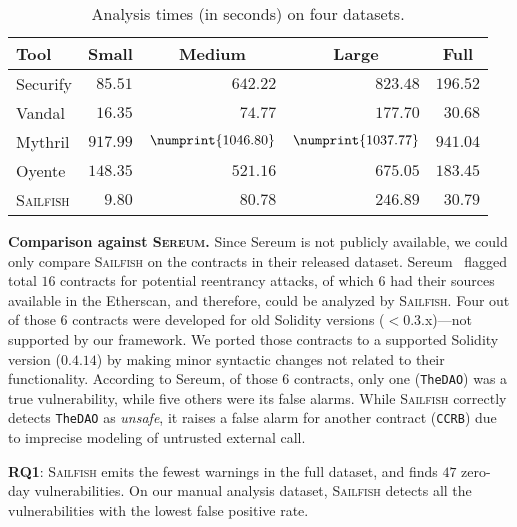 \documentclass[conference, romanappendices]{tex/IEEEtran}
\theoremstyle{bfnote}
\newcommand{\toolname}{\textsc{Sailfish}\xspace}
\newcommand{\oyente}{{\sc Oyente}\xspace}
\newcommand{\securify}{{\sc Securify}\xspace}
\newcommand{\sereum}{{\sc Sereum}\xspace}
\newcommand{\vandal}{{\sc Vandal}\xspace}
\newcommand{\solidity}{{\sc Solidity}\xspace}
\newcommand{\etherscan}{{\sc Etherscan}\xspace}
\newcommand{\mythril}{{\sc Mythril}\xspace}
\let\num\numprint
\newcommand{\zeroDays}{47}
\newcommand{\securifyAnalysisTimeSmall}{85.51}
\newcommand{\securifyAnalysisTimeMedium}{642.22}
\newcommand{\securifyAnalysisTimeLarge}{823.48}
\newcommand{\securifyAnalysisTimeFull}{196.52}
\newcommand{\vandalAnalysisTimeSmall}{16.35}
\newcommand{\vandalAnalysisTimeMedium}{74.77}
\newcommand{\vandalAnalysisTimeLarge}{177.70}
\newcommand{\vandalAnalysisTimeFull}{30.68}
\newcommand{\mythrilAnalysisTimeSmall}{917.99}
\newcommand{\mythrilAnalysisTimeMedium}{1046.80}
\newcommand{\mythrilAnalysisTimeLarge}{1037.77}
\newcommand{\mythrilAnalysisTimeFull}{941.04}
\newcommand{\oyenteAnalysisTimeSmall}{148.35}
\newcommand{\oyenteAnalysisTimeMedium}{521.16}
\newcommand{\oyenteAnalysisTimeLarge}{675.05}
\newcommand{\oyenteAnalysisTimeFull}{183.45}
\newcommand{\clintAnalysisTimeSmall}{9.80}
\newcommand{\clintAnalysisTimeMedium}{80.78}
\newcommand{\clintAnalysisTimeLarge}{246.89}
\newcommand{\clintAnalysisTimeFull}{30.79}
\begin{document}
\begin{table}[]
	\centering
	\begin{tabular}{l|rrrr}
		\toprule
		\textbf{Tool} & \multicolumn{1}{c}{\textbf{Small}} & \multicolumn{1}{c}{\textbf{Medium}} & \multicolumn{1}{c}{\textbf{Large}} & \multicolumn{1}{c}{\textbf{Full}} \\
		\midrule 
		\rowcolor{black!10} \securify & $\securifyAnalysisTimeSmall$ & $\securifyAnalysisTimeMedium$ & $\securifyAnalysisTimeLarge$ & $\securifyAnalysisTimeFull$ \\
		\vandal & $\vandalAnalysisTimeSmall$ & $\vandalAnalysisTimeMedium$ & $\vandalAnalysisTimeLarge$ & $\vandalAnalysisTimeFull$ \\
		\rowcolor{black!10} \mythril & $\mythrilAnalysisTimeSmall$ & $\num{\mythrilAnalysisTimeMedium}$ & $\num{\mythrilAnalysisTimeLarge}$ & $\mythrilAnalysisTimeFull$ \\
		\oyente & $\oyenteAnalysisTimeSmall$ & $\oyenteAnalysisTimeMedium$ & $\oyenteAnalysisTimeLarge$ & $\oyenteAnalysisTimeFull$ \\ 
		\rowcolor{black!10} \toolname & $\clintAnalysisTimeSmall$ & $\clintAnalysisTimeMedium$ & $\clintAnalysisTimeLarge$ & $\clintAnalysisTimeFull$ \\
		\bottomrule
	\end{tabular}
	\vspace{-1.5mm}
	\caption{\small Analysis times (in seconds) on four datasets.
	}
	\label{tbl:performance}
	\vspace{-6.5mm}
\end{table}

\noindent
\textbf{Comparison against \textsc{Sereum}.}
Since \sereum is not publicly available, we could only compare \toolname{} on the contracts in their released dataset.
\sereum~\cite{sereum} flagged total $16$ contracts for potential {reentrancy\EndAccSupp{}} attacks, of which $6$ had their sources available in the \etherscan, and therefore, could be analyzed by \toolname.
Four out of those $6$ contracts were developed for old \solidity{} versions ($<$0.3.x)---not supported by our framework.
We ported those contracts to a supported \solidity{} version ($0.4.14$) by making minor syntactic changes not related to their functionality.
According to \sereum, of those $6$ contracts, only one (\texttt{TheDAO}) was a true vulnerability, while five others were its false alarms.
While \toolname{} correctly detects \texttt{TheDAO} as \textit{unsafe}, it raises a false alarm for another contract (\texttt{CCRB}) due to imprecise modeling of untrusted external call.
\begin{mdframed}[style=graybox]
	\textbf{RQ1}: \toolname emits the fewest warnings in the full dataset, and finds $\zeroDays$ zero-day vulnerabilities.
	On our manual analysis dataset, \toolname detects all the vulnerabilities with the lowest false positive rate.
\end{mdframed}
\end{document}
